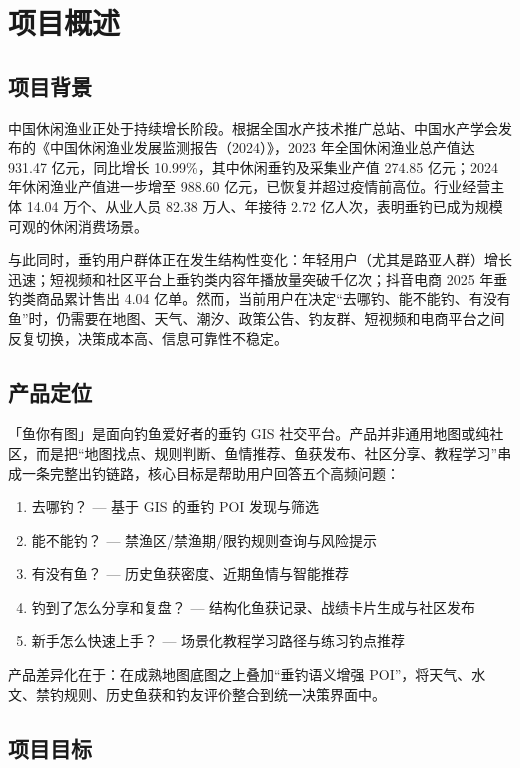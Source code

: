 \section{项目概述}

\subsection{项目背景}

中国休闲渔业正处于持续增长阶段。根据全国水产技术推广总站、中国水产学会发布的《中国休闲渔业发展监测报告（2024）》，2023 年全国休闲渔业总产值达 931.47 亿元，同比增长 10.99\%，其中休闲垂钓及采集业产值 274.85 亿元；2024 年休闲渔业产值进一步增至 988.60 亿元，已恢复并超过疫情前高位。行业经营主体 14.04 万个、从业人员 82.38 万人、年接待 2.72 亿人次，表明垂钓已成为规模可观的休闲消费场景。

与此同时，垂钓用户群体正在发生结构性变化：年轻用户（尤其是路亚人群）增长迅速；短视频和社区平台上垂钓类内容年播放量突破千亿次；抖音电商 2025 年垂钓类商品累计售出 4.04 亿单。然而，当前用户在决定“去哪钓、能不能钓、有没有鱼”时，仍需要在地图、天气、潮汐、政策公告、钓友群、短视频和电商平台之间反复切换，决策成本高、信息可靠性不稳定。

\subsection{产品定位}

「鱼你有图」是面向钓鱼爱好者的垂钓 GIS 社交平台。产品并非通用地图或纯社区，而是把“地图找点、规则判断、鱼情推荐、鱼获发布、社区分享、教程学习”串成一条完整出钓链路，核心目标是帮助用户回答五个高频问题：

\begin{enumerate}
  \item 去哪钓？ — 基于 GIS 的垂钓 POI 发现与筛选
  \item 能不能钓？ — 禁渔区/禁渔期/限钓规则查询与风险提示
  \item 有没有鱼？ — 历史鱼获密度、近期鱼情与智能推荐
  \item 钓到了怎么分享和复盘？ — 结构化鱼获记录、战绩卡片生成与社区发布
  \item 新手怎么快速上手？ — 场景化教程学习路径与练习钓点推荐
\end{enumerate}

产品差异化在于：在成熟地图底图之上叠加“垂钓语义增强 POI”，将天气、水文、禁钓规则、历史鱼获和钓友评价整合到统一决策界面中。

\subsection{项目目标}

